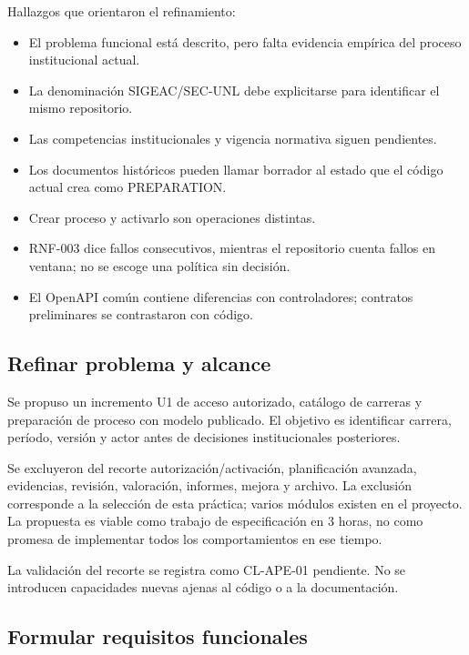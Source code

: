 \documentclass[11pt,a4paper]{article}
\providecommand{\tightlist}{\setlength{\itemsep}{0pt}\setlength{\parskip}{0pt}}
\begin{document}
Hallazgos que orientaron el refinamiento:

\begin{itemize}
\tightlist
\item
  El problema funcional está descrito, pero falta evidencia empírica del
  proceso institucional actual.
\item
  La denominación SIGEAC/SEC-UNL debe explicitarse para identificar el
  mismo repositorio.
\item
  Las competencias institucionales y vigencia normativa siguen
  pendientes.
\item
  Los documentos históricos pueden llamar borrador al estado que el
  código actual crea como PREPARATION.
\item
  Crear proceso y activarlo son operaciones distintas.
\item
  RNF-003 dice fallos consecutivos, mientras el repositorio cuenta
  fallos en ventana; no se escoge una política sin decisión.
\item
  El OpenAPI común contiene diferencias con controladores; contratos
  preliminares se contrastaron con código.
\end{itemize}

\subsection{Refinar problema y
alcance}\label{refinar-problema-y-alcance}

Se propuso un incremento U1 de acceso autorizado, catálogo de carreras y
preparación de proceso con modelo publicado. El objetivo es identificar
carrera, período, versión y actor antes de decisiones institucionales
posteriores.

Se excluyeron del recorte autorización/activación, planificación
avanzada, evidencias, revisión, valoración, informes, mejora y archivo.
La exclusión corresponde a la selección de esta práctica; varios módulos
existen en el proyecto. La propuesta es viable como trabajo de
especificación en 3 horas, no como promesa de implementar todos los
comportamientos en ese tiempo.

La validación del recorte se registra como CL-APE-01 pendiente. No se
introducen capacidades nuevas ajenas al código o a la documentación.

\subsection{Formular requisitos
funcionales}\label{formular-requisitos-funcionales}
\end{document}
